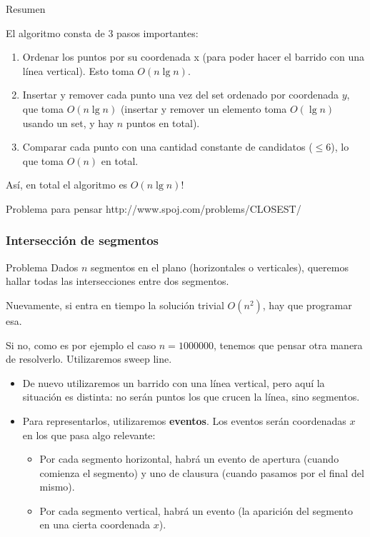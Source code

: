 \documentclass[compress]{beamer}
\begin{document}
\begin{frame}{Resumen}

El algoritmo consta de 3 pasos importantes:

\begin{enumerate}
\item Ordenar los puntos por su coordenada x (para poder hacer el barrido con una l\'inea vertical). Esto toma $O(n \lg n)$.
\item Insertar y remover cada punto una vez del set ordenado por coordenada $y$, que toma $O(n \lg n)$ (insertar y remover un elemento toma $O(\lg n)$ usando un set, y hay $n$ puntos en total).
\item Comparar cada punto con una cantidad constante de candidatos ($\leq 6$), lo que toma $O(n)$ en total.
\end{enumerate}
   
As\'i, en total el algoritmo es $O(n \lg n)$!
\end{frame}

\begin{frame}{Problema para pensar}
http://www.spoj.com/problems/CLOSEST/
\end{frame}

\subsubsection{Intersecci\'on de segmentos}

\begin{frame}
\begin{block}{Problema}
Dados $n$ segmentos en el plano (horizontales o verticales), queremos hallar todas las intersecciones entre dos segmentos.
\end{block}

\bigskip
Nuevamente, si entra en tiempo la soluci\'on trivial $O(n^2)$, hay que programar esa.
\bigskip

Si no, como es por ejemplo el caso $n = 1000000$, tenemos que pensar otra manera de resolverlo. Utilizaremos sweep line.

\end{frame}

\begin{frame}
\begin{itemize}
\item De nuevo utilizaremos un barrido con una l\'inea vertical, pero aqu\'i la situaci\'on es distinta: no ser\'an puntos los que crucen la l\'inea, sino segmentos.
\bigskip
\item Para representarlos, utilizaremos \textbf{eventos}. Los eventos ser\'an coordenadas $x$ en los que pasa algo relevante:
\bigskip
\begin{itemize}
\item Por cada segmento horizontal, habr\'a un evento de apertura (cuando comienza el segmento) y uno de clausura (cuando pasamos por el final del mismo). 
\bigskip

\item Por cada segmento vertical, habr\'a un evento (la aparici\'on del segmento en una cierta coordenada $x$).
\end{itemize}
\end{itemize}
\end{frame}
\end{document}
